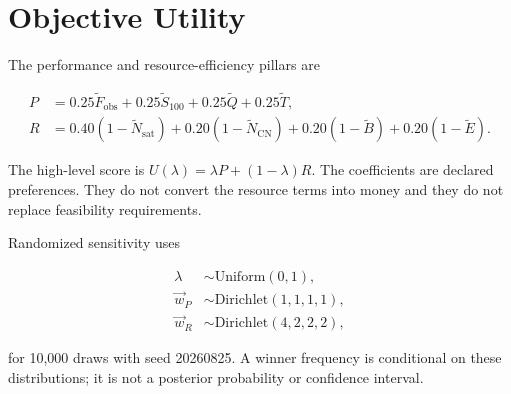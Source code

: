 \section{Objective Utility}

The performance and resource-efficiency pillars are

\begin{align}
P &= 0.25\widetilde F_{\mathrm{obs}}+0.25\widetilde S_{100}
+0.25\widetilde Q+0.25\widetilde T,\\
R &= 0.40(1-\widetilde N_{\mathrm{sat}})+0.20(1-\widetilde N_{\mathrm{CN}})
+0.20(1-\widetilde B)+0.20(1-\widetilde E).
\end{align}

The high-level score is $U(\lambda)=\lambda P+(1-\lambda)R$. The coefficients are declared preferences. They do not convert the resource terms into money and they do not replace feasibility requirements.

Randomized sensitivity uses

\begin{align}
\lambda &\sim \mathrm{Uniform}(0,1),\\
\vec{w}_{P} &\sim \mathrm{Dirichlet}(1,1,1,1),\\
\vec{w}_{R} &\sim \mathrm{Dirichlet}(4,2,2,2),
\end{align}

for 10,000 draws with seed 20260825. A winner frequency is conditional on these distributions; it is not a posterior probability or confidence interval.
